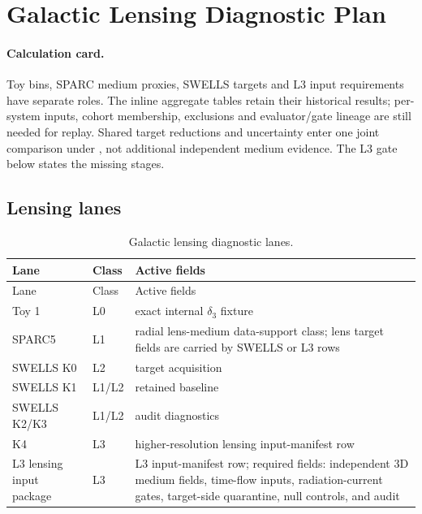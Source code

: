 \section{Galactic Lensing Diagnostic Plan}\label{manual:galactic-lensing-diagnostic-plan}

\paragraph{Calculation card.}
Toy bins, SPARC medium proxies, SWELLS targets and L3 input requirements have
separate roles. The inline aggregate tables retain their historical results;
per-system inputs, cohort membership, exclusions and evaluator/gate lineage
are still needed for replay. Shared target reductions and uncertainty enter
one joint comparison under , not additional
independent medium evidence. The L3 gate below states the missing stages.



\subsection{Lensing lanes}\label{manual:lensing-status-lock}
\small
\begin{longtable}{p{}p{}p{}}
\caption{Galactic lensing diagnostic lanes.}\label{tab:manual-lensing-status-lock}\\
\toprule
Lane & Class & Active fields\\
\midrule
\endfirsthead
\toprule
Lane & Class & Active fields\\
\midrule
\endhead
Toy 1 & L0 & exact internal \(\delta_3\) fixture\\
SPARC5 & L1 & radial lens-medium data-support class; lens target fields are carried by SWELLS or L3 rows\\
SWELLS K0 & L2 & target acquisition\\
SWELLS K1 & L1/L2 & retained baseline\\
SWELLS K2/K3 & L1/L2 & audit diagnostics\\
K4 & L3 & higher-resolution lensing input-manifest row\\
L3 lensing input package & L3 & L3 input-manifest row; required fields: independent 3D medium fields, time-flow inputs, radiation-current gates, target-side quarantine, null controls, and audit\\
\bottomrule
\end{longtable}
\normalsize

